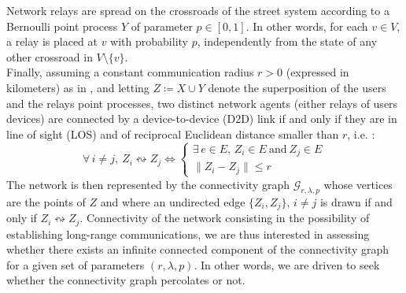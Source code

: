 \documentclass[conference]{IEEEtran}
\begin{document}
\indent Network relays are spread on the crossroads of the street system according to a Bernoulli point process $Y$ of parameter $p \in \left[0,1\right]$. In other words, for each $v \in V$, a relay is placed at $v$ with probability $p$, independently from the state of any other crossroad in $V \setminus \lbrace v\rbrace$. \\
\indent Finally, assuming a constant communication radius $r >0$ (expressed in kilometers) as in \cite{glauche_continuum_2003}, and letting $Z \coloneqq X \cup Y$ denote the superposition of the users and the relays point processes, two distinct network agents (either relays of users devices) are connected by a device-to-device (D2D) link if and only if they are in line of sight (LOS) and of reciprocal Euclidean distance smaller than $r$, i.e. :
\begin{equation}
\label{connectivity_mechanism}
\forall \, i \neq j, \: Z_{i} \leftrightsquigarrow Z_{j} \Leftrightarrow 
\left\{
\begin{array}{l}
\exists \, e \in E, \, Z_{i} \in E  \  \text{and} \  Z_{j} \in E \\
\lVert Z_{i} - Z_{j} \rVert \leq r
\end{array}
\right.
\end{equation}
\indent The network is then represented by the connectivity graph $\mathcal{G}_{r,\lambda,p}$ whose vertices are the points of $Z$ and where an undirected edge $\lbrace Z_{i},Z_{j}\rbrace, \, i \neq j $ is drawn if and only if $Z_{i} \leftrightsquigarrow Z_{j}$. Connectivity of the network consisting in the possibility of establishing long-range communications, we are thus interested in assessing whether there exists an infinite connected component of the connectivity graph for a given set of parameters $(r,\lambda,p)$. In other words, we are driven to seek whether the connectivity graph percolates \cite{meester_continuum_1996} or not. 
\end{document}

